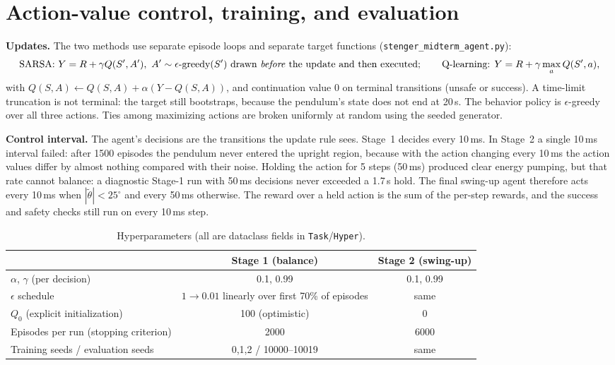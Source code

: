 \documentclass[11pt]{article}
\newcommand{\thw}{\tilde\theta}
\begin{document}
\section{Action-value control, training, and evaluation}

\textbf{Updates.} The two methods use separate episode loops and separate target functions
(\texttt{stenger\_midterm\_agent.py}):
\[
\text{SARSA: } Y=R+\gamma Q(S',A'),\ A'\sim\epsilon\text{-greedy}(S')\text{ drawn \emph{before} the update and then executed};\qquad
\text{Q-learning: } Y=R+\gamma\max_a Q(S',a),
\]
with $Q(S,A)\leftarrow Q(S,A)+\alpha(Y-Q(S,A))$, and continuation value $0$ on terminal transitions
(unsafe or success). A time-limit truncation is not terminal: the target still bootstraps,
because the pendulum's state does not end at 20\,s. The behavior policy is $\epsilon$-greedy over
all three actions. Ties among maximizing actions are broken uniformly at random using the
seeded generator.

\textbf{Control interval.} The agent's decisions are the transitions the update rule sees.
Stage~1 decides every 10\,ms. In Stage~2 a single 10\,ms interval failed: after 1500 episodes the
pendulum never entered the upright region, because with the action changing every 10\,ms
the action values differ by almost nothing compared with their noise. Holding the action for
5 steps (50\,ms) produced clear energy pumping, but that rate cannot balance: a diagnostic Stage-1
run with 50\,ms decisions never exceeded a 1.7\,s hold. The final swing-up agent therefore acts
every 10\,ms when $|\thw|<25^\circ$ and every 50\,ms otherwise. The reward over a held action is the
sum of the per-step rewards, and the success and safety checks still run on every 10\,ms step.

\begin{table}[H]\centering\small
\begin{tabular}{lcc}\toprule
 & Stage 1 (balance) & Stage 2 (swing-up)\\\midrule
$\alpha$, $\gamma$ (per decision) & 0.1, 0.99 & 0.1, 0.99\\
$\epsilon$ schedule & $1\to0.01$ linearly over first 70\% of episodes & same\\
$Q_0$ (explicit initialization) & 100 (optimistic) & 0\\
Episodes per run (stopping criterion) & 2000 & 6000\\
Training seeds / evaluation seeds & 0,1,2 / 10000--10019 & same\\\bottomrule
\end{tabular}
\caption{Hyperparameters (all are dataclass fields in \texttt{Task}/\texttt{Hyper}).}\label{tab:hyper}
\end{table}
\end{document}
